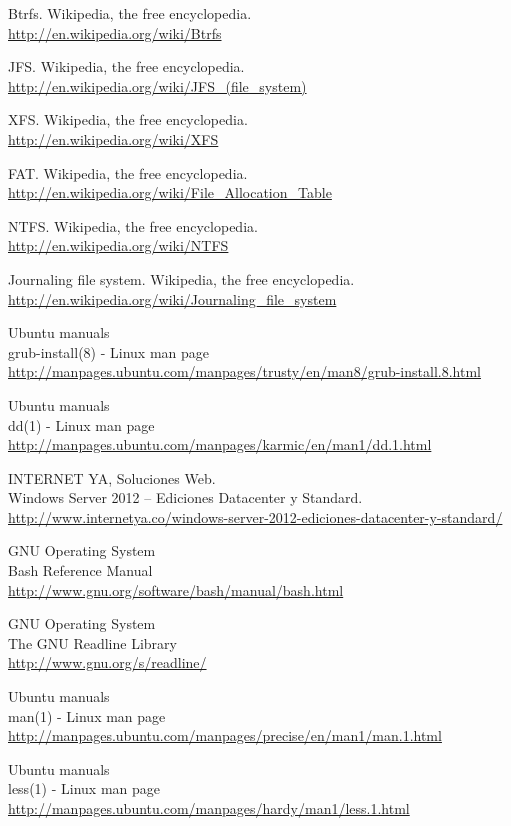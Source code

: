 \documentclass[paper=a4, fontsize=11pt]{scrartcl} %
\numberwithin{equation}{section} %
\numberwithin{figure}{section} %
\numberwithin{table}{section} %
\begin{document}
\begin{thebibliography}{10}
Btrfs. Wikipedia, the free encyclopedia.\\
  \url{http://en.wikipedia.org/wiki/Btrfs}

JFS. Wikipedia, the free encyclopedia.\\
  \url{http://en.wikipedia.org/wiki/JFS_(file_system)}

XFS. Wikipedia, the free encyclopedia.\\
  \url{http://en.wikipedia.org/wiki/XFS}

FAT. Wikipedia, the free encyclopedia.\\
  \url{http://en.wikipedia.org/wiki/File_Allocation_Table}

NTFS. Wikipedia, the free encyclopedia.\\
  \url{http://en.wikipedia.org/wiki/NTFS}

Journaling file system. Wikipedia, the free encyclopedia.\\
  \url{http://en.wikipedia.org/wiki/Journaling_file_system}

Ubuntu manuals\\
grub-install(8) - Linux man page\\
  \url{http://manpages.ubuntu.com/manpages/trusty/en/man8/grub-install.8.html}

Ubuntu manuals\\
dd(1) - Linux man page\\
\url{http://manpages.ubuntu.com/manpages/karmic/en/man1/dd.1.html}

INTERNET YA, Soluciones Web.\\
Windows Server 2012 – Ediciones Datacenter y Standard.\\
  \url{http://www.internetya.co/windows-server-2012-ediciones-datacenter-y-standard/}

GNU Operating System\\
Bash Reference Manual\\
\url{http://www.gnu.org/software/bash/manual/bash.html}

GNU Operating System\\
The GNU Readline Library\\
\url{http://www.gnu.org/s/readline/}

Ubuntu manuals\\
man(1) - Linux man page\\
\url{http://manpages.ubuntu.com/manpages/precise/en/man1/man.1.html}

Ubuntu manuals\\
less(1) - Linux man page\\
\url{http://manpages.ubuntu.com/manpages/hardy/man1/less.1.html}

\end{thebibliography}
\end{document}
